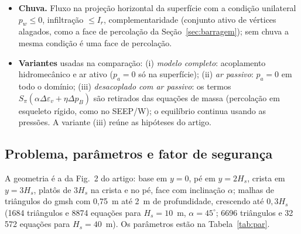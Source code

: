\begin{itemize}
por $\Delta t$ e \textbf{jacobiano consistente completo} (inclui $\partial\lambda/\partial p$, $\partial S/\partial p$,
$\partial c_a/\partial p_a$, $\partial\chi/\partial p$ e a anisotropia); a converg\^encia quadr\'atica foi verificada
(res\'iduo das equa\c{c}\~oes de massa $5\cdot10^{-5}\to3\cdot10^{-9}\to2\cdot10^{-15}$). As condi\c{c}\~oes de
Dirichlet s\~ao eliminadas pelo filtro de equa\c{c}\~oes e o sistema \'e resolvido com Pardiso (MKL).
\item \textbf{Chuva.} Fluxo na proje\c{c}\~ao horizontal da superf\'icie com a condi\c{c}\~ao unilateral
$p_w\le0$, infiltra\c{c}\~ao $\le I_r$, complementaridade (conjunto ativo de v\'ertices alagados, como a face de
percola\c{c}\~ao da Se\c{c}\~ao~\ref{sec:barragem}); sem chuva a mesma condi\c{c}\~ao \'e uma face de percola\c{c}\~ao.
\item \textbf{Variantes} usadas na compara\c{c}\~ao: (i) \emph{modelo completo}: acoplamento hidromec\^anico e ar
ativo ($p_a=0$ s\'o na superf\'icie); (ii) \emph{ar passivo}: $p_a=0$ em todo o dom\'inio; (iii)
\emph{desacoplado com ar passivo}: os termos $S_\pi(\alpha\Delta\varepsilon_v+\eta\Delta p_B)$ s\~ao retirados das
equa\c{c}\~oes de massa (percola\c{c}\~ao em esqueleto r\'igido, como no SEEP/W); o equil\'ibrio continua usando as
press\~oes. A variante (iii) re\'une as hip\'oteses do artigo.
\end{itemize}

\subsection{Problema, par\^ametros e fator de seguran\c{c}a}

A geometria \'e a da Fig.~2 do artigo: base em $y=0$, p\'e em $y=2H_s$, crista em $y=3H_s$, plat\^os de $3H_s$ na
crista e no p\'e, face com inclina\c{c}\~ao $\alpha$; malhas de tri\^angulos do gmsh com 0,75~m at\'e 2~m de
profundidade, crescendo at\'e $0{,}3H_s$ (1684 tri\^angulos e 8874 equa\c{c}\~oes para $H_s=10$~m, $\alpha=45^\circ$;
6696 tri\^angulos e 32\,572 equa\c{c}\~oes para $H_s=40$~m). Os par\^ametros est\~ao na Tabela~\ref{tab:par}.

